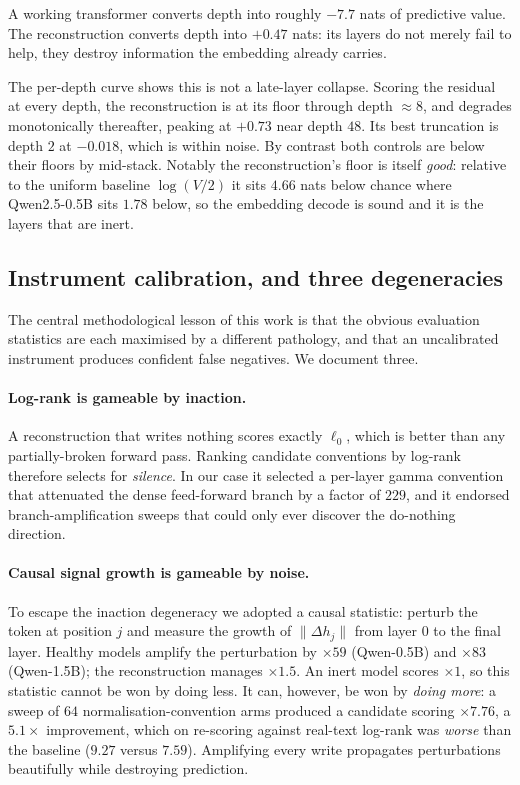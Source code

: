 \begin{finding}
A working transformer converts depth into roughly $-7.7$ nats of predictive value. The
reconstruction converts depth into $+0.47$ nats: its layers do not merely fail to help, they
destroy information the embedding already carries.
\end{finding}

The per-depth curve shows this is not a late-layer collapse. Scoring the residual at every depth,
the reconstruction is at its floor through depth $\approx 8$, and degrades monotonically
thereafter, peaking at $+0.73$ near depth $48$. Its best truncation is depth $2$ at $-0.018$, which
is within noise. By contrast both controls are below their floors by mid-stack. Notably the
reconstruction's floor is itself \emph{good}: relative to the uniform baseline $\log(V/2)$ it sits
$4.66$ nats below chance where Qwen2.5-0.5B sits $1.78$ below, so the embedding decode is sound and
it is the layers that are inert.

\subsection{Instrument calibration, and three degeneracies}

The central methodological lesson of this work is that the obvious evaluation statistics are each
maximised by a different pathology, and that an uncalibrated instrument produces confident false
negatives. We document three.

\paragraph{Log-rank is gameable by inaction.} A reconstruction that writes nothing scores exactly
$\ell_0$, which is better than any partially-broken forward pass. Ranking candidate conventions by
log-rank therefore selects for \emph{silence}. In our case it selected a per-layer gamma
convention that attenuated the dense feed-forward branch by a factor of $229$, and it endorsed
branch-amplification sweeps that could only ever discover the do-nothing direction.

\paragraph{Causal signal growth is gameable by noise.} To escape the inaction degeneracy we
adopted a causal statistic: perturb the token at position $j$ and measure the growth of
$\lVert\Delta h_j\rVert$ from layer $0$ to the final layer. Healthy models amplify the perturbation
by $\times 59$ (Qwen-0.5B) and $\times 83$ (Qwen-1.5B); the reconstruction manages $\times 1.5$. An
inert model scores $\times 1$, so this statistic cannot be won by doing less. It can, however, be
won by \emph{doing more}: a sweep of $64$ normalisation-convention arms produced a candidate
scoring $\times 7.76$, a $5.1\times$ improvement, which on re-scoring against real-text log-rank was
\emph{worse} than the baseline ($9.27$ versus $7.59$). Amplifying every write propagates
perturbations beautifully while destroying prediction.

